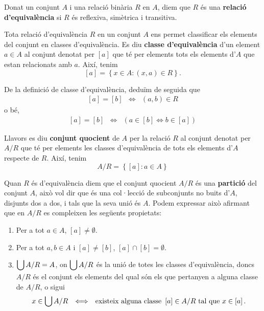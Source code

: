 Donat un conjunt $A$ i una relació binària $R$ en $A$, diem que $R$
és una \textbf{relació d'equivalència} si $R$ és reflexiva,
simètrica i transitiva.

Tota relació d'equivalència $R$ en un conjunt $A$ ens permet
classificar els elements del conjunt en classes d'equivalència. Es diu
\textbf{classe d'equivalència} d'un element $a\in A$ al conjunt denotat
per $\left[ a\right] $ que té per elements tots els elements d'$A$ que
estan relacionats amb $a$. Així, tenim%
\begin{equation*}
\left[ a\right] =\left\{ x\in A:(x,a)\in R\right\} \text{.}
\end{equation*}

De la definició de classe d'equivalència, deduïm de seguida que%
\begin{equation*}
\begin{array}{ccc}
\left[ a\right] =\left[ b\right] & \Longleftrightarrow & (a,b)\in R%
\end{array}
\end{equation*}
o bé,%
\begin{equation*}
\begin{array}{ccc}
\left[ a\right] =\left[ b\right] & \Longleftrightarrow & \left( a\in\left[ b%
\right] \Longleftrightarrow b\in\left[ a\right] \right)%
\end{array}
\end{equation*}

Llavors es diu \textbf{conjunt quocient} de $A$ per la relació $R$ al
conjunt denotat per $A/R$ que té per elements les classes d'equivalència de tots els elements d'$A$ respecte de $R$. Així, tenim%
\begin{equation*}
A/R=\left\{ \left[ a\right] :a\in A\right\}
\end{equation*}

Quan $R$ és d'equivalència diem que el conjunt quocient $A/R$ és
una \textbf{partició} del conjunt $A$, això vol dir que és una
col·lecció de subconjunts no buits d'$A$, disjunts
dos a dos, i tals que la seva unió és $A$. Podem expressar això
afirmant que en $A/R$ es compleixen les següents propietats:

\begin{enumerate}
\item Per a tot $a\in A$, $\left[ a\right] \neq\emptyset$.

\item Per a tot $a,b\in A$ i $\left[ a\right] \neq\left[ b\right] $, $\left[
a\right] \cap\left[ b\right] =\emptyset$.

\item $\displaystyle\bigcup A/R=A$, on $\displaystyle\bigcup A/R$ és la unió de totes les
classes d'equivalència, doncs $A/R$ és el conjunt els elements del
qual són els que pertanyen a alguna classe de $A/R$, o sigui
\begin{equation*}
\begin{array}{ccc}
x\in\displaystyle\bigcup A/R & \Longleftrightarrow & \text{existeix alguna classe }\left[
a\right] \in A/R\text{ tal que }x\in\left[ a\right] \text{.}
\end{array}
\end{equation*}
\end{enumerate}

